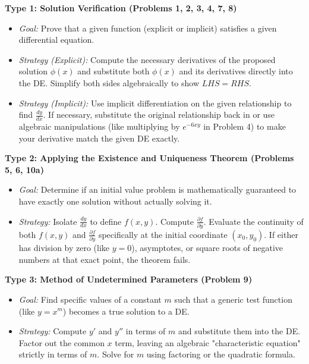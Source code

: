 \documentclass[12pt]{article}
\begin{document}
\textbf{Type 1: Solution Verification (Problems 1, 2, 3, 4, 7, 8)}
\begin{itemize}
    \item \textit{Goal:} Prove that a given function (explicit or implicit) satisfies a given differential equation.
    \item \textit{Strategy (Explicit):} Compute the necessary derivatives of the proposed solution $\phi(x)$ and substitute both $\phi(x)$ and its derivatives directly into the DE. Simplify both sides algebraically to show $LHS = RHS$.
    \item \textit{Strategy (Implicit):} Use implicit differentiation on the given relationship to find $\frac{dy}{dx}$. If necessary, substitute the original relationship back in or use algebraic manipulations (like multiplying by $e^{-6xy}$ in Problem 4) to make your derivative match the given DE exactly.
\end{itemize}

\textbf{Type 2: Applying the Existence and Uniqueness Theorem (Problems 5, 6, 10a)}
\begin{itemize}
    \item \textit{Goal:} Determine if an initial value problem is mathematically guaranteed to have exactly one solution without actually solving it.
    \item \textit{Strategy:} Isolate $\frac{dy}{dx}$ to define $f(x,y)$. Compute $\frac{\partial f}{\partial y}$. Evaluate the continuity of both $f(x,y)$ and $\frac{\partial f}{\partial y}$ specifically at the initial coordinate $(x_0, y_0)$. If either has division by zero (like $y=0$), asymptotes, or square roots of negative numbers at that exact point, the theorem fails.
\end{itemize}

\textbf{Type 3: Method of Undetermined Parameters (Problem 9)}
\begin{itemize}
    \item \textit{Goal:} Find specific values of a constant $m$ such that a generic test function (like $y = x^m$) becomes a true solution to a DE.
    \item \textit{Strategy:} Compute $y'$ and $y''$ in terms of $m$ and substitute them into the DE. Factor out the common $x$ term, leaving an algebraic "characteristic equation" strictly in terms of $m$. Solve for $m$ using factoring or the quadratic formula.
\end{itemize}
\end{document}

